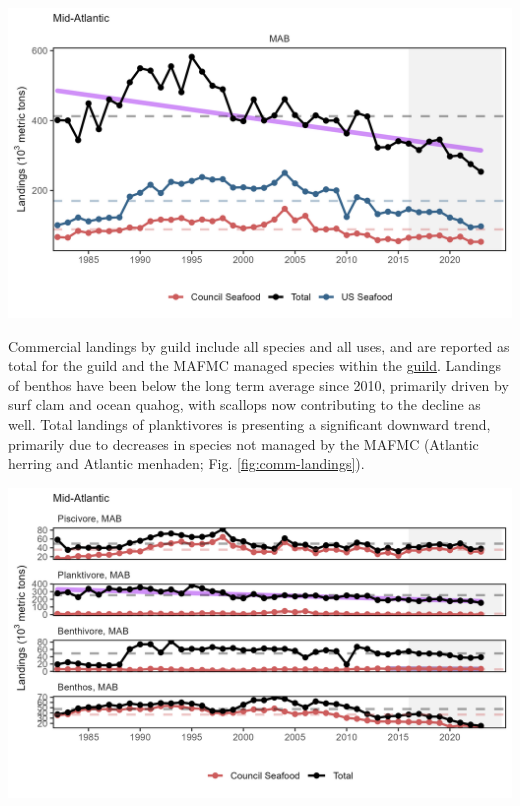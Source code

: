\documentclass[
  10pt,
]{article}
\let\origfigure\figure
\let\endorigfigure\endfigure
\renewenvironment{figure}[1][2] {
    \expandafter\origfigure\expandafter[H]
} {
    \endorigfigure
}
\begin{document}
\begin{figure}

{\centering \includegraphics[width=6.5in]{images/MidAtlantic/total_landings_MidAtlantic_2025-09-05} 

}

\caption{Total commercial landings (black), total U.S. seafood landings (blue), and Mid-Atlantic managed U.S. seafood landings (red), with significant decline (purple) in total landings.}\label{fig:total-landings}
\end{figure}

Commercial landings by guild include all species and all uses, and are reported as total for the guild and the MAFMC managed species within the \href{https://noaa-edab.github.io/catalog/species_groupings.html}{guild}. Landings of benthos have been below the long term average since 2010, primarily driven by surf clam and ocean quahog, with scallops now contributing to the decline as well. Total landings of planktivores is presenting a significant downward trend, primarily due to decreases in species not managed by the MAFMC (Atlantic herring and Atlantic menhaden; Fig. \ref{fig:comm-landings}).

\begin{figure}

{\centering \includegraphics[width=6.5in]{images/MidAtlantic/commercial_landings_MidAtlantic_2025-09-05} 

}

\caption{Total commercial landings in the Mid-Atlantic Bight (black) and MAFMC-managed U.S seafood landings (red) by feeding guild, with significant declines (purple) in total planktivore landings.}\label{fig:comm-landings}
\end{figure}
\end{document}

